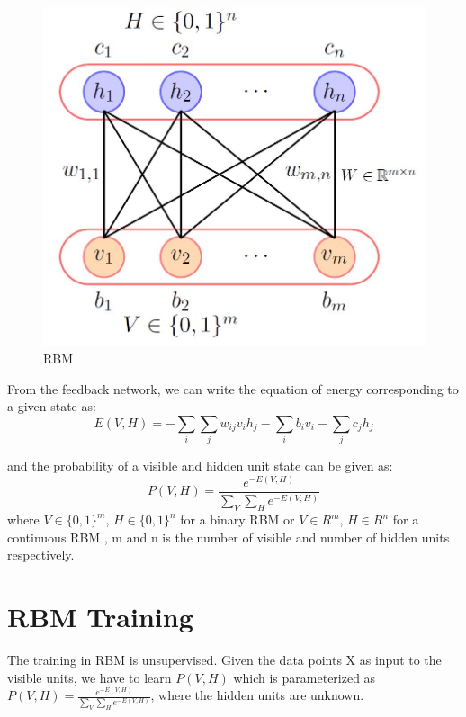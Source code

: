 \begin{spacing}{1.5}
\begin{figure}[h]
    \centering
    \includegraphics[scale=0.70]{Chapters/Figures/lect_19_slide_43_RBM.JPG}
    \caption{RBM}
    \label{rbm}
\end{figure}





From the feedback network, we can write the equation of energy corresponding to a given state as:
\begin{equation}
    E(V,H)=-\sum_{i}\sum_{j}w_{ij}v_{i}h_{j}-\sum_{i}b_{i}v_{i}-\sum_{j}c_{j}h_{j}
\end{equation}

and the probability of a visible and hidden unit state can be given as:
\begin{equation}
    P(V,H)=\frac{e^{-E(V,H)}}{\sum_{V}\sum_{H}e^{-E(V,H)}}
\end{equation}
where  $V \in \{0,1\}^{m}$, $H \in \{0,1\}^{n}$  for a binary RBM or $V \in R^{m}$, $H \in R^{n}$ for a continuous RBM , m and n is the number of visible and number of hidden units respectively. 
\section{RBM Training}
The training in RBM is unsupervised. Given the data points X as input to the visible units, we have to learn $P(V,H)$ which is parameterized as $ P(V,H)=\frac{e^{-E(V,H)}}{\sum_{V}\sum_{H}e^{-E(V,H)}}$, where the hidden units are unknown. 


\end{spacing}

